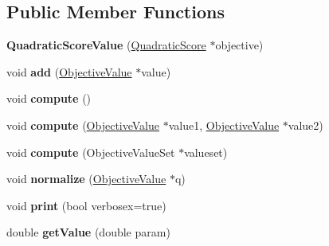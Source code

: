\subsection*{Public Member Functions}
\begin{DoxyCompactItemize}
\item 
\hypertarget{classQuadraticScoreValue_abbce11b4309f6e360d03d8e1a7b28cb4}{{\bfseries Quadratic\-Score\-Value} (\hyperlink{classQuadraticScore}{Quadratic\-Score} $\ast$objective)}\label{classQuadraticScoreValue_abbce11b4309f6e360d03d8e1a7b28cb4}

\item 
\hypertarget{classQuadraticScoreValue_a64b8a6403b233d9987887a9cbf8fe0e0}{void {\bfseries add} (\hyperlink{classObjectiveValue}{Objective\-Value} $\ast$value)}\label{classQuadraticScoreValue_a64b8a6403b233d9987887a9cbf8fe0e0}

\item 
\hypertarget{classQuadraticScoreValue_a947f6baf8f3e399e2d187fa9cc8aa9f0}{void {\bfseries compute} ()}\label{classQuadraticScoreValue_a947f6baf8f3e399e2d187fa9cc8aa9f0}

\item 
\hypertarget{classQuadraticScoreValue_a43cf55f4511efa6b9bf31795cf74799e}{void {\bfseries compute} (\hyperlink{classObjectiveValue}{Objective\-Value} $\ast$value1, \hyperlink{classObjectiveValue}{Objective\-Value} $\ast$value2)}\label{classQuadraticScoreValue_a43cf55f4511efa6b9bf31795cf74799e}

\item 
\hypertarget{classQuadraticScoreValue_a05a712cbae65fea1cf36f1781717a0db}{void {\bfseries compute} (Objective\-Value\-Set $\ast$valueset)}\label{classQuadraticScoreValue_a05a712cbae65fea1cf36f1781717a0db}

\item 
\hypertarget{classQuadraticScoreValue_acd3eccf5b32b18548a269a4ff5579a3c}{void {\bfseries normalize} (\hyperlink{classObjectiveValue}{Objective\-Value} $\ast$q)}\label{classQuadraticScoreValue_acd3eccf5b32b18548a269a4ff5579a3c}

\item 
\hypertarget{classQuadraticScoreValue_a07a28d7846c056af3198c4eba18bdeab}{void {\bfseries print} (bool verbosex=true)}\label{classQuadraticScoreValue_a07a28d7846c056af3198c4eba18bdeab}

\item 
\hypertarget{classQuadraticScoreValue_aaa7e06ba63a372539e87643b2e67d10d}{double {\bfseries get\-Value} (double param)}\label{classQuadraticScoreValue_aaa7e06ba63a372539e87643b2e67d10d}

\end{DoxyCompactItemize}
